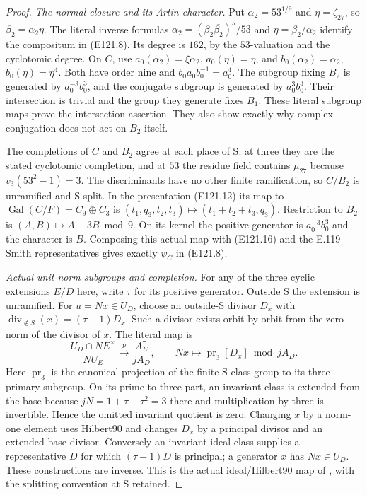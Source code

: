 \begin{proof}
\emph{The normal closure and its Artin character.}
Put $\alpha_2=53^{1/9}$ and $\eta=\zeta_{27}$, so
$\beta_2=\alpha_2\eta$. The literal inverse formulas
$\alpha_2=(\beta_2\overline{\beta_2})^5/53$ and
$\eta=\beta_2/\alpha_2$ identify the compositum in (E121.8).
Its degree is $162$, by the $53$-valuation and the cyclotomic
degree. On $C$, use
$a_0(\alpha_2)=\xi\alpha_2$, $a_0(\eta)=\eta$, and
$b_0(\alpha_2)=\alpha_2$, $b_0(\eta)=\eta^4$.
Both have order nine and $b_0a_0b_0^{-1}=a_0^4$.
The subgroup fixing $B_2$ is generated by
$a_0^{-3}b_0^3$, and the conjugate subgroup is generated
by $a_0^3b_0^3$. Their intersection is trivial and the group
they generate fixes $B_1$. These literal subgroup maps
prove the intersection assertion. They also show exactly
why complex conjugation does not act on $B_2$ itself.

The completions of $C$ and $B_2$ agree at each place of S:
at three they are the stated cyclotomic completion, and
at $53$ the residue field contains $\mu_{27}$ because
$v_3(53^2-1)=3$. The discriminants have no other finite
ramification, so $C/B_2$ is unramified and S-split.
In the presentation (E121.12) its map to
$\operatorname{Gal}(C/F)=C_9\oplus C_3$ is
$(t_1,q_3,t_2,t_3)\mapsto(t_1+t_2+t_3,q_3)$.
Restriction to $B_2$ is $(A,B)\mapsto A+3B\bmod9$.
On its kernel the positive generator is
$a_0^{-3}b_0^3$ and the character is $B$.
Composing this actual map with (E121.16) and the E.119
Smith representatives gives exactly $\psi_C$ in (E121.8).

\emph{Actual unit norm subgroups and completion.}
For any of the three cyclic extensions $E/D$ here, write
$\tau$ for its positive generator. Outside S the extension
is unramified. For $u=Nx\in U_D$, choose an outside-S divisor
$D_x$ with
$\operatorname{div}_{\notin S}(x)=(\tau-1)D_x$.
Such a divisor exists orbit by orbit from the zero norm of
the divisor of $x$. The literal map is
\[
 \frac{U_D\cap N E^\times}{N U_E}
 \xrightarrow{\ \nu\ }
 \frac{A_E^\tau}{jA_D},\qquad
 Nx\longmapsto\operatorname{pr}_3[D_x]\bmod jA_D.
 \tag{E121.20}
\]
Here $\operatorname{pr}_3$ is the canonical projection of the finite
S-class group to its three-primary subgroup. On its prime-to-three
part, an invariant class is extended from the base because
$jN=1+\tau+\tau^2=3$ there and multiplication by three is
invertible. Hence the omitted invariant quotient is zero.
Changing $x$ by a norm-one element uses Hilbert90 and changes
$D_x$ by a principal divisor and an extended base divisor.
Conversely an invariant ideal class supplies a representative
$D$ for which $(\tau-1)D$ is principal; a generator $x$
has $Nx\in U_D$. These constructions are inverse.
This is the actual ideal/Hilbert90 map of
\cite[Proposition1 and its full ideal proof]{E_LemmermeyerAmbiguous},
with the splitting convention at S retained.


\end{proof}
